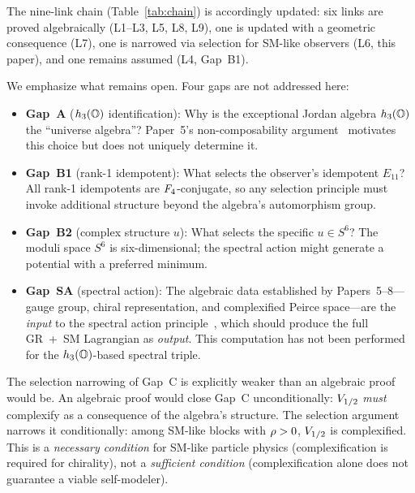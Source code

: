 The nine-link chain (Table~\ref{tab:chain}) is accordingly updated:
six links are proved algebraically (L1--L3, L5, L8, L9), one is
updated with a geometric consequence (L7), one is narrowed via
selection for SM-like observers (L6, this paper), and one remains
assumed (L4, Gap~B1).

We emphasize what remains open.  Four gaps are not addressed here:
\begin{itemize}
  \item \textbf{Gap~A} ($h_3(\mathbb{O})$ identification): Why is the
    exceptional Jordan algebra $h_3(\mathbb{O})$ the ``universe algebra''?
    Paper~5's non-composability argument~\cite{Paper5} motivates this
    choice but does not uniquely determine it.

  \item \textbf{Gap~B1} (rank-1 idempotent): What selects the
    observer's idempotent $E_{11}$?  All rank-1 idempotents are
    $F_4$-conjugate, so any selection principle must invoke
    additional structure beyond the algebra's automorphism group.

  \item \textbf{Gap~B2} (complex structure $u$): What selects the
    specific $u\in S^6$?  The moduli space $S^6$ is six-dimensional;
    the spectral action might generate a potential with a preferred
    minimum.

  \item \textbf{Gap~SA} (spectral action): The algebraic data
    established by Papers~5--8---gauge group, chiral representation,
    and complexified Peirce space---are the \emph{input} to the
    spectral action principle~\cite{CCM2007}, which should produce
    the full GR~+~SM Lagrangian as \emph{output}.  This computation
    has not been performed for the $h_3(\mathbb{O})$-based spectral triple.
\end{itemize}

\noindent
The selection narrowing of Gap~C is explicitly weaker than an
algebraic proof would be.  An algebraic proof would close Gap~C
unconditionally: $V_{1/2}$ \emph{must} complexify as a consequence of
the algebra's structure.  The selection argument narrows it
conditionally: among SM-like blocks with $\rho > 0$, $V_{1/2}$ is
complexified.  This is a \emph{necessary condition} for SM-like
particle physics (complexification is required for chirality), not
a \emph{sufficient condition} (complexification alone does not
guarantee a viable self-modeler).

